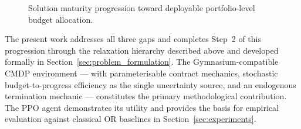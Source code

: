 \begin{figure}[htbp]
  \caption{Solution maturity progression toward deployable portfolio-level budget
    allocation.}
  \label{fig:maturity}
  \end{figure}

The present work addresses all three gaps and completes Step~2 of this
progression through the relaxation hierarchy described above and developed
formally in Section~\ref{sec:problem_formulation}. The Gymnasium-compatible CMDP environment --- with parameterisable contract
mechanics, stochastic budget-to-progress efficiency as the single uncertainty
source, and an endogenous termination mechanic --- constitutes the primary
methodological contribution. The PPO agent demonstrates its utility and
provides the basis for empirical evaluation against classical OR baselines in
Section~\ref{sec:experiments}.



